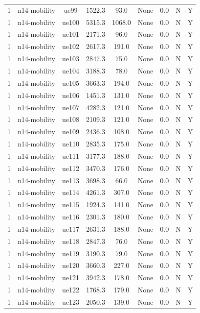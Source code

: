 \begin{table}[ht]
\begin{tabular}{|c|c|c|c|c|c|c|c|c|}
1 & n14-mobility & ue99 & 1522.3 & 93.0 & None & 0.0 & N & Y \\
1 & n14-mobility & ue100 & 5315.3 & 1068.0 & None & 0.0 & N & Y \\
1 & n14-mobility & ue101 & 2171.3 & 96.0 & None & 0.0 & N & Y \\
1 & n14-mobility & ue102 & 2617.3 & 191.0 & None & 0.0 & N & Y \\
1 & n14-mobility & ue103 & 2847.3 & 75.0 & None & 0.0 & N & Y \\
1 & n14-mobility & ue104 & 3188.3 & 78.0 & None & 0.0 & N & Y \\
1 & n14-mobility & ue105 & 3663.3 & 194.0 & None & 0.0 & N & Y \\
1 & n14-mobility & ue106 & 1451.3 & 131.0 & None & 0.0 & N & Y \\
1 & n14-mobility & ue107 & 4282.3 & 121.0 & None & 0.0 & N & Y \\
1 & n14-mobility & ue108 & 2109.3 & 121.0 & None & 0.0 & N & Y \\
1 & n14-mobility & ue109 & 2436.3 & 108.0 & None & 0.0 & N & Y \\
1 & n14-mobility & ue110 & 2835.3 & 175.0 & None & 0.0 & N & Y \\
1 & n14-mobility & ue111 & 3177.3 & 188.0 & None & 0.0 & N & Y \\
1 & n14-mobility & ue112 & 3470.3 & 176.0 & None & 0.0 & N & Y \\
1 & n14-mobility & ue113 & 3698.3 & 66.0 & None & 0.0 & N & Y \\
1 & n14-mobility & ue114 & 4261.3 & 307.0 & None & 0.0 & N & Y \\
1 & n14-mobility & ue115 & 1924.3 & 141.0 & None & 0.0 & N & Y \\
1 & n14-mobility & ue116 & 2301.3 & 180.0 & None & 0.0 & N & Y \\
1 & n14-mobility & ue117 & 2631.3 & 188.0 & None & 0.0 & N & Y \\
1 & n14-mobility & ue118 & 2847.3 & 76.0 & None & 0.0 & N & Y \\
1 & n14-mobility & ue119 & 3190.3 & 79.0 & None & 0.0 & N & Y \\
1 & n14-mobility & ue120 & 3660.3 & 227.0 & None & 0.0 & N & Y \\
1 & n14-mobility & ue121 & 3942.3 & 178.0 & None & 0.0 & N & Y \\
1 & n14-mobility & ue122 & 1768.3 & 179.0 & None & 0.0 & N & Y \\
1 & n14-mobility & ue123 & 2050.3 & 139.0 & None & 0.0 & N & Y \\

\end{tabular}
\end{table}
